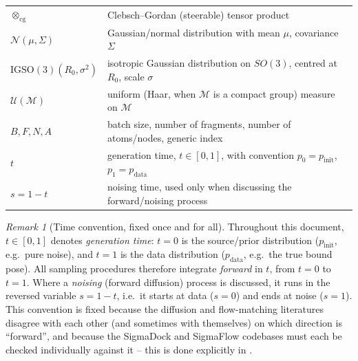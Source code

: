 \documentclass[11pt,a4paper]{report}
\theoremstyle{definition}
\theoremstyle{remark}
\newtheorem{remark}[remark]{Remark}
\begin{document}
\begin{center}
\begin{longtable}{p{3.6cm}p{10.5cm}}
$\otimes_{\mathrm{cg}}$ & Clebsch--Gordan (steerable) tensor product \\
$\mathcal N(\mu,\Sigma)$ & Gaussian/normal distribution with mean $\mu$, covariance $\Sigma$ \\
$\mathrm{IGSO}(3)(R_0,\sigma^2)$ & isotropic Gaussian distribution on $SO(3)$, centred at $R_0$, scale $\sigma$ \\
$\mathcal U(\mathcal M)$ & uniform (Haar, when $\mathcal M$ is a compact group) measure on $\mathcal M$ \\
$B,F,N,A$ & batch size, number of fragments, number of atoms/nodes, generic index \\
$t$ & generation time, $t\in[0,1]$, with convention $p_0 = p_{\mathrm{init}}$, $p_1 = p_{\mathrm{data}}$ \\
$s = 1-t$ & noising time, used only when discussing the forward/noising process \\
\bottomrule
\end{longtable}
\end{center}

\begin{remark}[Time convention, fixed once and for all]
\label{rem:time-convention-global}
Throughout this document, $t \in [0,1]$ denotes \emph{generation time}: $t=0$
is the source/prior distribution ($p_{\mathrm{init}}$, e.g.\ pure noise), and
$t=1$ is the data distribution ($p_{\mathrm{data}}$, e.g.\ the true bound
pose). All sampling procedures therefore integrate \emph{forward} in $t$,
from $t=0$ to $t=1$. Where a \emph{noising} (forward diffusion) process is
discussed, it runs in the reversed variable $s = 1-t$, i.e.\ it starts at
data ($s=0$) and ends at noise ($s=1$). This convention is fixed because the
diffusion and flow-matching literatures disagree with each other (and
sometimes with themselves) on which direction is ``forward'', and because
the SigmaDock and SigmaFlow codebases must each be checked individually
against it -- this is done explicitly in .
\end{remark}
\end{document}
